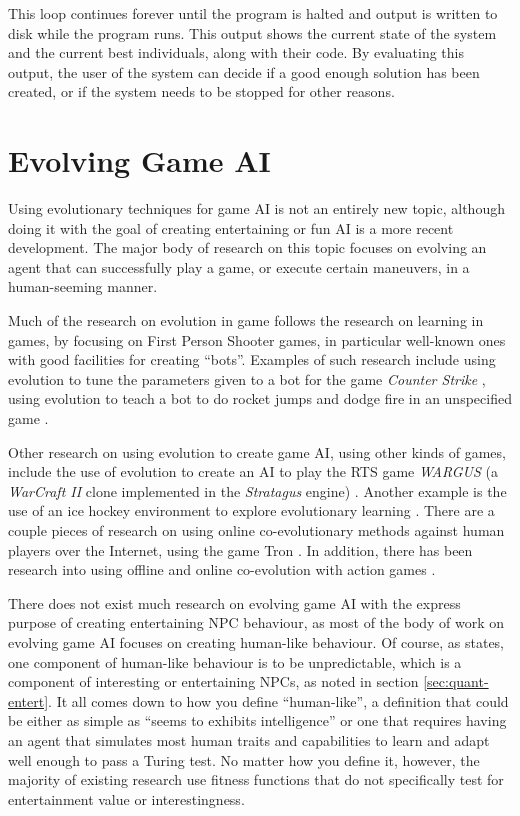 This loop continues forever until the program is halted and output is written
to disk while the program runs. This output shows the current state of the
system and the current best individuals, along with their code. By evaluating
this output, the user of the system can decide if a good enough solution has
been created, or if the system needs to be stopped for other reasons.

\section{Evolving Game AI}
\label{cha:game-ai-via}

Using evolutionary techniques for game AI is not an entirely new topic, although
doing it with the goal of creating entertaining or fun AI is a more recent
development. The major body of research on this topic focuses on evolving an
agent that can successfully play a game, or execute certain maneuvers, in a
human-seeming manner.

Much of the research on evolution in game follows the research on learning in
games, by focusing on First Person Shooter games, in particular well-known ones
with good facilities for creating ``bots''. Examples of such research include
using evolution to tune the parameters given to a bot for the game \emph{Counter
  Strike} \citep{cole2004using}, using evolution to teach a bot to do rocket
jumps and dodge fire in an unspecified game \citep{champandard2003ai}.

Other research on using evolution to create game AI, using other kinds of games,
include the use of evolution to create an AI to play the RTS game \emph{WARGUS}
(a \emph{WarCraft II} clone implemented in the \emph{Stratagus} engine)
\citep{spronck2004difficulty}. Another example is the use of an ice hockey
environment to explore evolutionary learning \citep{blair1999exploring}. There
are a couple pieces of research on using online co-evolutionary methods against
human players over the Internet, using the game Tron
\citep{funes2000measuring,funes1998animal}. In addition, there has been research
into using offline and online co-evolution with action games
\citep{demasi2003online}.

There does not exist much research on evolving game AI with the express purpose
of creating entertaining NPC behaviour, as most of the body of work on evolving
game AI focuses on creating human-like behaviour. Of course, as
\citet{bauckhage2003learning} states, one component of human-like behaviour is
to be unpredictable, which is a component of interesting or entertaining NPCs,
as noted in section \ref{sec:quant-entert}. It all comes down to how you define
``human-like'', a definition that could be either as simple as ``seems to
exhibits intelligence'' or one that requires having an agent that simulates most
human traits and capabilities to learn and adapt well enough to pass a Turing
test. No matter how you define it, however, the majority of existing research
use fitness functions that do not specifically test for entertainment value or
interestingness.

